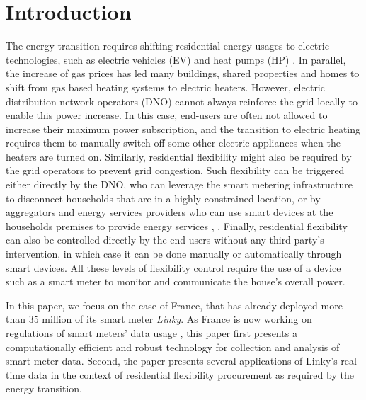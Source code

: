 \documentclass[conference]{IEEEtran}
\begin{document}
	\section{Introduction}
	The energy transition requires shifting  residential energy usages to electric technologies, such as electric vehicles (EV) and heat pumps (HP)
	\cite{RTEScenario:techrep}. In parallel, the increase of gas prices has led many buildings, shared properties and homes to shift from gas based heating systems to electric heaters. However,   electric distribution  network operators (DNO) cannot always  reinforce the grid locally to enable this power increase.
	In this case, end-users are often not allowed to increase their maximum power subscription, and the transition to electric heating requires them to manually switch off some other electric appliances when the heaters are turned on. 
	Similarly, residential flexibility might also be required by the grid operators to prevent grid congestion.
	Such flexibility can be triggered either directly by the DNO, who can leverage the smart metering infrastructure to disconnect  households that are in a highly constrained location, or by aggregators and energy services providers who can use smart devices at the households premises to provide energy services  \cite{voltalis:website}, \cite{chargeangels:website}. Finally, residential flexibility can also be controlled directly by the end-users without any third party's intervention, in which case it can be done manually or automatically through smart devices. All these levels of flexibility control require the use of a device such as a smart meter to monitor and communicate the house's overall power. 
	
	In this paper, we focus on the case of France, that has already deployed more than 35 million of its smart meter \textit{Linky}.
	As France is now working on regulations of smart meters' data usage \cite{cre:website}, this paper first presents a computationally efficient and robust technology for collection and analysis of smart meter data. Second, the paper presents several applications of Linky's real-time data in the context of residential flexibility procurement as required by the energy transition. 
	
\end{document}
